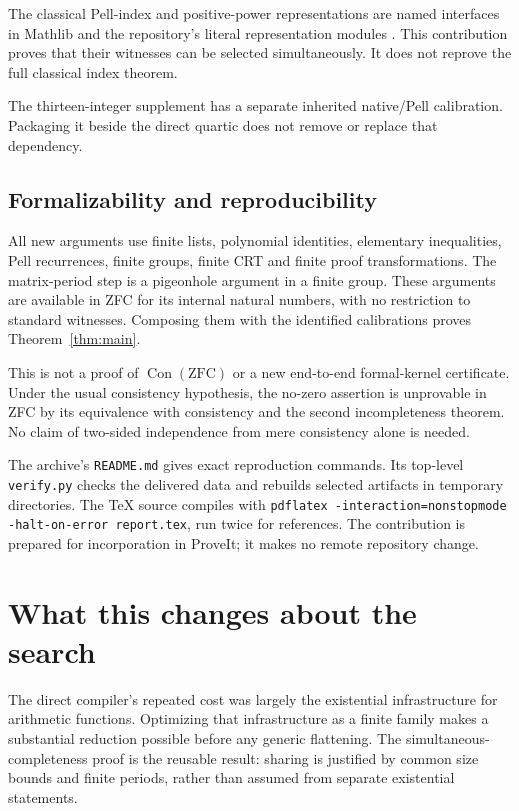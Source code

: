 \documentclass[11pt,letterpaper]{article}
\newcommand{\Con}{\operatorname{Con}}
\newcommand{\ZFC}{\mathrm{ZFC}}
\newcommand{\file}[1]{\nolinkurl{#1}}
\begin{document}
The classical Pell-index and positive-power
representations are named interfaces in Mathlib
and the repository's literal representation modules
\cite{pell}. This contribution proves that their
witnesses can be selected simultaneously. It does
not reprove the full classical index theorem.

The thirteen-integer supplement has a separate
inherited native/Pell calibration. Packaging it
beside the direct quartic does not remove or replace
that dependency.

\subsection{Formalizability and reproducibility}

All new arguments use finite lists, polynomial
identities, elementary inequalities, Pell
recurrences, finite groups, finite CRT and finite
proof transformations. The matrix-period step is
a pigeonhole argument in a finite group. These
arguments are available in ZFC for its internal
natural numbers, with no restriction to standard
witnesses. Composing them with the identified
calibrations proves Theorem~\ref{thm:main}.

This is not a proof of $\Con(\ZFC)$ or a new
end-to-end formal-kernel certificate. Under the
usual consistency hypothesis, the no-zero
assertion is unprovable in ZFC by its equivalence
with consistency and the second incompleteness
theorem. No claim of two-sided independence from
mere consistency alone is needed.

The archive's \file{README.md} gives exact
reproduction commands. Its top-level
\file{verify.py} checks the delivered data and
rebuilds selected artifacts in temporary
directories. The TeX source compiles with
\texttt{pdflatex -interaction=nonstopmode
-halt-on-error report.tex}, run twice for
references. The contribution is prepared for
incorporation in ProveIt; it makes no remote
repository change.

\section{What this changes about the search}

The direct compiler's repeated cost was largely
the existential infrastructure for arithmetic
functions. Optimizing that infrastructure as a
finite family makes a substantial reduction
possible before any generic flattening.
The simultaneous-completeness proof is the
reusable result: sharing is justified by common
size bounds and finite periods, rather than
assumed from separate existential statements.
\end{document}
